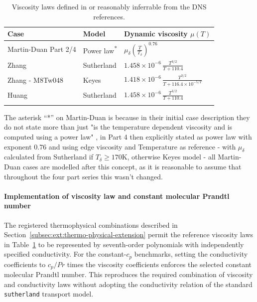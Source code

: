 \begin{table}[H]
    \centering
    \caption{Viscosity laws defined in or reasonably inferrable from the DNS references.}
    \label{tab:evaluation:viscosity-laws}
    \centering
    \renewcommand{\arraystretch}{1.5}
    \begin{tabular}{@{}lll@{}}
        \toprule
        Case & Model & Dynamic viscosity \(\mu(T)\) \\
        \midrule
        Martin-Duan Part 2/4 & Power law\textsuperscript{*} & \(\displaystyle \mu_\delta\left(\frac{T}{T_\delta}\right)^{0.76}\) \\
        \addlinespace[1ex]
        Zhang & Sutherland & \(\displaystyle 1.458\times10^{-6}\,\frac{T^{3/2}}{T+110.4}\) \\
        \addlinespace[1ex]
        Zhang - M8Tw048 & Keyes & \(\displaystyle 1.418\times10^{-6}\,\frac{T^{3/2}}{T+116.4\times10^{-5/T}}\)\footnotemark \\
        \addlinespace[1ex]
        Huang & Sutherland & \(\displaystyle 1.458\times10^{-6}\,\frac{T^{3/2}}{T+110.4}\) \\
        \addlinespace[0.5ex]
        \bottomrule
    \end{tabular}
\end{table}

The asterisk ``*'' on Martin-Duan is because in their initial case description they do not state more than just "is the temperature dependent viscosity and is computed using a power law" \cite[p. 348]{martin2007direct_Part1}, in Part 4 then explicitly stated as power law with exponent \(0.76\) and using edge viscosity and Temperature as reference - with \(\mu_\delta\) calculated from Sutherland if \(T_\delta \geq 170 \mathrm{K}\), otherwise Keyes model \cite[Eq. 2.14 and following text]{duan2011direct_Part4} - all Martin-Duan cases are modelled after this concept, as it is reasonable to assume that throughout the four part series this wasn't changed.

\paragraph*{Implementation of viscosity law and constant molecular Prandtl number}
The registered thermophysical combinations described in
Section~\ref{subsec:ext:thermo-physical-extension} permit the reference
viscosity laws in Table~\ref{tab:evaluation:viscosity-laws} to be represented
by seventh-order polynomials with independently specified conductivity.
For the constant-\(c_p\) benchmarks, setting the conductivity coefficients to
\(c_p/Pr\) times the viscosity coefficients enforces the selected constant
molecular Prandtl number. This reproduces the required combination of
viscosity and conductivity laws without adopting the conductivity relation
of the standard \texttt{sutherland} transport model.
\par\medskip

